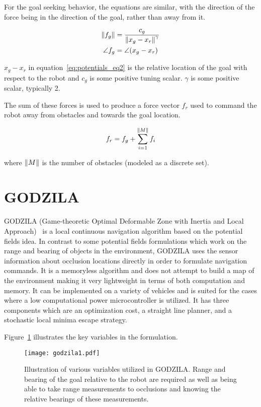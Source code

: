 For the goal seeking behavior, the equations are similar, with the direction of the force being in the direction of the 
goal, rather than away from it.

\begin{align}
	\left\lVert f_g\right\rVert  &= \frac{c_g}{\left\lVert x_g - x_r\right\rVert^\gamma}\\
	\angle{f_g} &= \angle(x_g - x_r)
\label{eq:potentials_eq2}
\end{align}

$x_g - x_r$ in equation~\ref{eq:potentials_eq2} is the relative location of the goal with respect to the robot and $c_g$ is some positive
tuning scalar. $\gamma$ is some positive scalar, typically 2.

The sum of these forces is used to produce a force vector $f_r$ used to command the robot away from obstacles and towards the goal
location. 

\begin{equation}
	f_r = f_g + \sum_{i = 1}^{\left\lVert M\right\rVert} f_i
\label{eq:potentials_eq3}
\end{equation}

where $\left\lVert M\right\rVert$ is the number of obstacles (modeled as a discrete set).

\section{GODZILA}\label{sec:navgodzila}

GODZILA (Game-theoretic Optimal Deformable Zone with Inertia and Local Approach)~\cite{Krishnamurthy07} is a local 
continuous navigation algorithm based on the potential fields idea. In contrast to some potential fields formulations
which work on the range and bearing of objects in the environment, GODZILA uses the sensor information about occlusion
locations directly in order to formulate navigation commands. It is a memoryless algorithm and does not attempt to
build a map of the environment making it very lightweight in terms of both computation and memory. It can be implemented
on a variety of vehicles and is suited for the cases where a low computational power microcontroller is utilized.
It has three components which are an optimization cost, a straight line planner, and a stochastic local minima escape strategy.

Figure~\ref{fig:godzila_setup1} illustrates the key variables in the formulation.
\begin{figure}
\centering
\texttt{[image: godzila1.pdf]}
\caption{Illustration of various variables utilized in GODZILA\@. Range and bearing of the goal relative to the robot are required
         as well as being able to take range measurements to occlusions and knowing the relative bearings of these measurements.}
\label{fig:godzila_setup1}
\end{figure}

